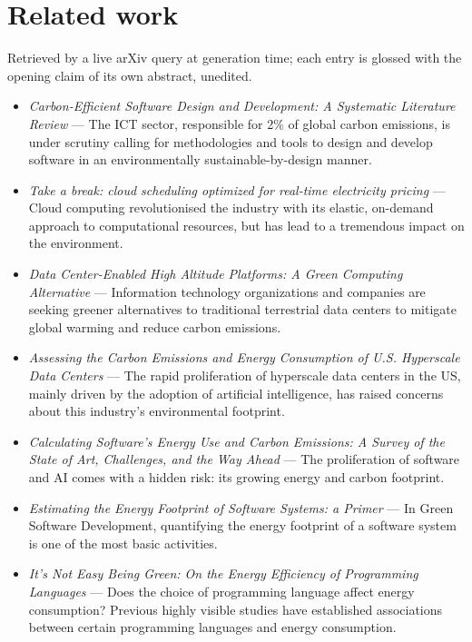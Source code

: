 \documentclass[11pt,a4paper]{article}
\providecommand{\textcite}[1]{\cite{#1}}
\begin{document}
\section{Related work}
\noindent Retrieved by a live arXiv query at generation time; each entry is glossed with the opening claim of its own abstract, unedited.

\begin{itemize}[leftmargin=1.3em,itemsep=2pt]
\item \textcite{arxiv2407_19901} \emph{Carbon-Efficient Software Design and Development: A Systematic Literature Review} --- The ICT sector, responsible for 2\% of global carbon emissions, is under scrutiny calling for methodologies and tools to design and develop software in an environmentally sustainable-by-design manner.
\item \textcite{arxiv1307_7037} \emph{Take a break: cloud scheduling optimized for real-time electricity pricing} --- Cloud computing revolutionised the industry with its elastic, on-demand approach to computational resources, but has lead to a tremendous impact on the environment.
\item \textcite{arxiv2309_09241} \emph{Data Center-Enabled High Altitude Platforms: A Green Computing Alternative} --- Information technology organizations and companies are seeking greener alternatives to traditional terrestrial data centers to mitigate global warming and reduce carbon emissions.
\item \textcite{arxiv2606_05420} \emph{Assessing the Carbon Emissions and Energy Consumption of U.S. Hyperscale Data Centers} --- The rapid proliferation of hyperscale data centers in the US, mainly driven by the adoption of artificial intelligence, has raised concerns about this industry's environmental footprint.
\item \textcite{arxiv2506_09683} \emph{Calculating Software's Energy Use and Carbon Emissions: A Survey of the State of Art, Challenges, and the Way Ahead} --- The proliferation of software and AI comes with a hidden risk: its growing energy and carbon footprint.
\item \textcite{arxiv2407_11611} \emph{Estimating the Energy Footprint of Software Systems: a Primer} --- In Green Software Development, quantifying the energy footprint of a software system is one of the most basic activities.
\item \textcite{arxiv2410_05460} \emph{It's Not Easy Being Green: On the Energy Efficiency of Programming Languages} --- Does the choice of programming language affect energy consumption? Previous highly visible studies have established associations between certain programming languages and energy consumption.

\end{itemize}
\end{document}
